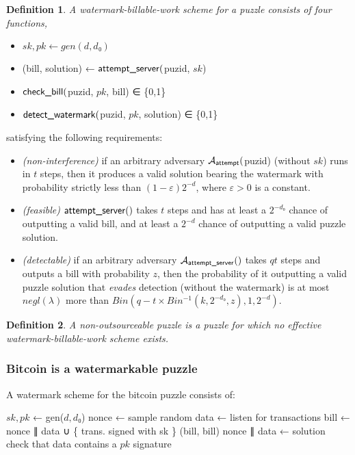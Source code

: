 \documentclass[]{article}
\newtheorem{definition}{Definition}
\theoremstyle{remark}
\newcommand{\hash}{\mathcal{H}}
\newcommand{\Adv}{\mathcal{A}}
\newcommand{\unn}[1]{\textnormal{\textsf{#1}}}
\begin{document}
\begin{definition}A watermark-billable-work scheme for a puzzle consists of four functions,
\end{definition}
\begin{itemize}
\item $sk,pk ← gen(d,d₀)$
\item (bill, solution) ← $\unn{attempt\_server}($puzid, $sk$)
\item $\unn{check\_bill}($puzid, $pk$, bill) ∈ \{0,1\}
\item $\unn{detect\_watermark}($puzid, $pk$, solution) ∈ \{0,1\}
\end{itemize}
satisfying the following requirements:
\begin{itemize}
\item {\em (non-interference)} if an arbitrary adversary $\Adv_{\unn{attempt}}($puzid) (without $sk$) runs in $t$ steps, then it produces a valid solution bearing the watermark with probability strictly less than $(1-ε)2^{-d}$, where $ε>0$ is a constant.
\item {\em (feasible)} $\unn{attempt\_server}()$ takes $t$ steps and has at least a $2^{-d₀}$ chance of outputting a valid bill, and at least a $2^{-d}$ chance of outputting a valid puzzle solution.
\item {\em (detectable)} if an arbitrary adversary $\Adv_{\unn{attempt\_server}}()$ takes $qt$ steps and outputs a bill with probability $z$, then the probability of it outputting a valid puzzle solution that {\em evades} detection  (without the watermark) is at most $negl(λ)$ more than $Bin(q-t×Bin^{-1}(k,2^{-d₀},z), 1, 2^{-d})$.
\end{itemize}

\begin{definition}
A non-outsourceable puzzle is a puzzle for which no effective watermark-billable-work scheme exists.
\end{definition}

\subsubsection{Bitcoin is a watermarkable puzzle}

A watermark scheme for the bitcoin puzzle consists of:

\begin{algorithmic}[0]
  \State
  \State $sk,pk$ ← gen($d,d₀$)
  \State
    \State nonce ← sample random
    \State data ← listen for transactions
    \State bill ← nonce ∥ data ∪ \{ trans. signed with sk \}
    \State \Return (bill, bill)
  \EndFunction
  \State
    \State \Return {$\hash($puzid$ || $bill$) < 2^{-d₀}$}
  \EndFunction
  \State
     \State nonce ∥ data ← solution
     \State check that data contains a $pk$ signature
  \EndFunction
\end{algorithmic}
\end{document}
